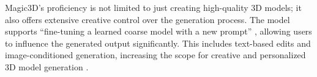 Magic3D's proficiency is not limited to just creating high-quality 3D models; it also offers extensive creative control over the generation process. The model supports ``fine-tuning a learned coarse model with a new prompt'' \citep{lin2023magic3d}, allowing users to influence the generated output significantly. This includes text-based edits and image-conditioned generation, increasing the scope for creative and personalized 3D model generation \citep{lin2023magic3d}.